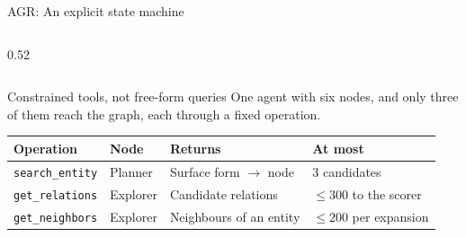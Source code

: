 \begin{frame}{AGR: An explicit state machine}
\begin{columns}[T]
\begin{column}{0.52\textwidth}
    \end{column}
  \end{columns}
  \centrebody
\end{frame}

\begin{frame}{Constrained tools, not free-form queries}
  One agent with six nodes, and only three of them reach the graph, each
  through a fixed operation.
  \begin{table}
    \small
    \begin{tabular}{@{}llll@{}}
      \toprule
      \textbf{Operation} & \textbf{Node} & \textbf{Returns} &
      \textbf{At most} \\
      \midrule
      \texttt{search\_entity}  & Planner  & Surface form $\rightarrow$ node
                               & $3$ candidates \\
      \texttt{get\_relations}  & Explorer & Candidate relations
                               & $\leq 300$ to the scorer \\
      \texttt{get\_neighbors}  & Explorer & Neighbours of an entity
                               & $\leq 200$ per expansion \\

\end{tabular}
\end{table}
\end{frame}
